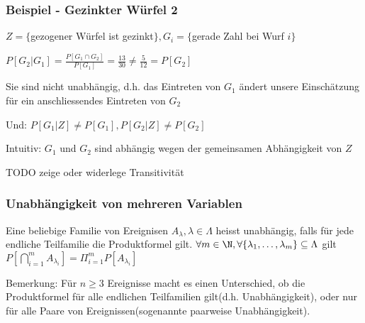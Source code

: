 \subsubsection{Beispiel - Gezinkter Würfel 2}
\enumstart
	\item $Z = \{$gezogener Würfel ist gezinkt$\}, G_i = \{$gerade Zahl bei Wurf $i\}$
	\item $P[G_2 | G_1] = \frac{P[G_1 \cap G_2]}{P[G_1]} = \frac{13}{30} \ne \frac{5}{12} = P[G_2]$
	\item Sie sind nicht unabhängig, d.h. das Eintreten von $G_1$ ändert unsere Einschätzung für ein anschliessendes Eintreten von $G_2$
	\item Und: $P[G_1 | Z] \ne P[G_1], P[G_2 | Z] \ne P[G_2]$
	\item Intuitiv: $G_1$ und $G_2$ sind abhängig wegen der gemeinsamen Abhängigkeit von $Z$
	\enumstart
		\item TODO zeige oder widerlege Transitivität
	\enumend
\enumend

\subsubsection{Unabhängigkeit von mehreren Variablen}
\enumstart
	\item Eine beliebige Familie von Ereignisen $A_\lambda, \lambda \in \Lambda$ heisst unabhängig, falls für jede endliche Teilfamilie die Produktformel gilt. $\forall m \in \N, \forall \{\lambda_1, \mathellipsis, \lambda_m\} \subseteq \Lambda$ gilt $P[\bigcap^m_{i=1}A_{\lambda_i}] = \Pi^m_{i=1}P[A_{\lambda_i}]$
	\item Bemerkung: Für $n \ge 3$ Ereignisse macht es einen Unterschied, ob die Produktformel für alle endlichen Teilfamilien gilt(d.h. Unabhängigkeit), oder nur für alle Paare von Ereignissen(sogenannte paarweise Unabhängigkeit).
\enumend

